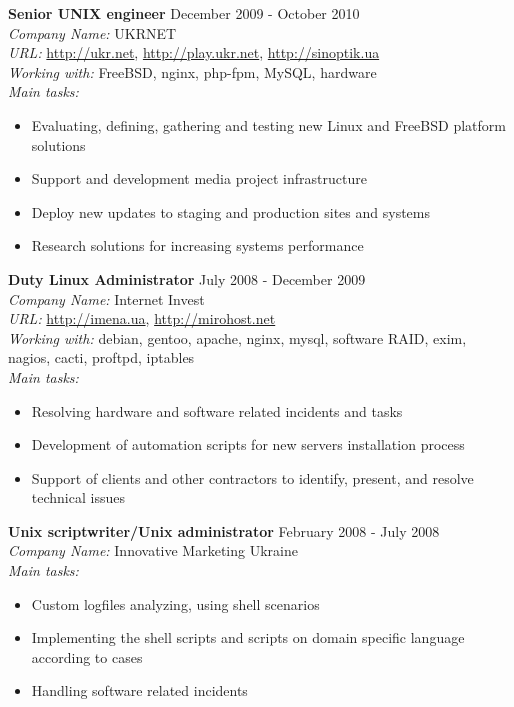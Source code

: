 \documentclass[mymargin,10pt]{res} %
\begin{document}
\begin{resume}
{\bf Senior UNIX engineer} \hfill December 2009 - October 2010 \\
{\sl Company Name:} UKRNET \\
{\sl URL:} \url{http://ukr.net}, \url{http://play.ukr.net}, \url{http://sinoptik.ua} \\
{\sl Working with:} FreeBSD, nginx, php-fpm, MySQL, hardware \\
{\sl Main tasks:}
\begin{itemize}
\item Evaluating, defining, gathering and testing new Linux and FreeBSD platform solutions
\item Support and development media project infrastructure
\item Deploy new updates to staging and production sites and systems
\item Research solutions for increasing systems performance
\end{itemize}

{\bf Duty Linux Administrator} \hfill July 2008 - December 2009 \\
{\sl Company Name:} Internet Invest \\
{\sl URL:} \url{http://imena.ua}, \url{http://mirohost.net}\\
{\sl Working with:} debian, gentoo, apache, nginx, mysql, software RAID, exim, nagios, cacti, proftpd,
iptables \\
{\sl Main tasks:}
\begin{itemize}
\item Resolving hardware and software related incidents and tasks
\item Development of automation scripts for new servers installation process
\item Support of clients and other contractors to identify, present, and resolve technical issues
\end{itemize}

{\bf Unix scriptwriter/Unix administrator} \hfill February 2008 - July 2008 \\
{\sl Company Name:} Innovative Marketing Ukraine \\
{\sl Main tasks:}
\begin{itemize}
\item Custom logfiles analyzing, using shell scenarios
\item Implementing the shell scripts and scripts on domain specific language according to cases
\item Handling software related incidents
\end{itemize}


\end{resume}
\end{document}
